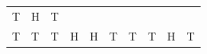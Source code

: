 {\begin{tabular}[t]{|l|l|l|l|l|l|l|l|l|l|}
        T &
        H &
        T%
     \tabularnewline\cline{1-1}\cline{2-2}\cline{3-3}\cline{4-4}\cline{5-5}\cline{6-6}\cline{7-7}\cline{8-8}\cline{9-9}\cline{10-10}
        T &
        T &
        T &
        H &
        H &
        T &
        T &
        T &
        H &
        T%
     \tabularnewline\cline{1-1}\cline{2-2}\cline{3-3}\cline{4-4}\cline{5-5}\cline{6-6}\cline{7-7}\cline{8-8}\cline{9-9}\cline{10-10}
    \end{tabular}} %

